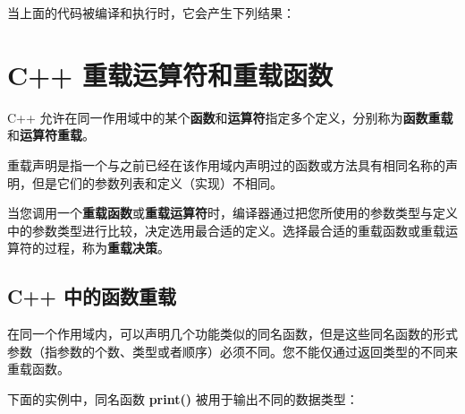\documentclass[
]{article}
\newenvironment{Shaded}{}{}
\newcommand{\CommentTok}[1]{\textcolor[rgb]{0.38,0.63,0.69}{\textit{#1}}}
\newcommand{\ControlFlowTok}[1]{\textcolor[rgb]{0.00,0.44,0.13}{\textbf{#1}}}
\newcommand{\DecValTok}[1]{\textcolor[rgb]{0.25,0.63,0.44}{#1}}
\newcommand{\ErrorTok}[1]{\textcolor[rgb]{1.00,0.00,0.00}{\textbf{#1}}}
\newcommand{\NormalTok}[1]{#1}
\newcommand{\OperatorTok}[1]{\textcolor[rgb]{0.40,0.40,0.40}{#1}}
\newcommand{\StringTok}[1]{\textcolor[rgb]{0.25,0.44,0.63}{#1}}
\begin{document}
\begin{Shaded}
\end{Shaded}

当上面的代码被编译和执行时，它会产生下列结果：

\begin{Shaded}
\end{Shaded}

\hypertarget{c-ux91cdux8f7dux8fd0ux7b97ux7b26ux548cux91cdux8f7dux51fdux6570}{%
\section{C++
重载运算符和重载函数}\label{c-ux91cdux8f7dux8fd0ux7b97ux7b26ux548cux91cdux8f7dux51fdux6570}}

C++
允许在同一作用域中的某个\textbf{函数}和\textbf{运算符}指定多个定义，分别称为\textbf{函数重载}和\textbf{运算符重载}。

重载声明是指一个与之前已经在该作用域内声明过的函数或方法具有相同名称的声明，但是它们的参数列表和定义（实现）不相同。

当您调用一个\textbf{重载函数}或\textbf{重载运算符}时，编译器通过把您所使用的参数类型与定义中的参数类型进行比较，决定选用最合适的定义。选择最合适的重载函数或重载运算符的过程，称为\textbf{重载决策}。

\hypertarget{c-ux4e2dux7684ux51fdux6570ux91cdux8f7d}{%
\subsection{C++
中的函数重载}\label{c-ux4e2dux7684ux51fdux6570ux91cdux8f7d}}

在同一个作用域内，可以声明几个功能类似的同名函数，但是这些同名函数的形式参数（指参数的个数、类型或者顺序）必须不同。您不能仅通过返回类型的不同来重载函数。

下面的实例中，同名函数 \textbf{print()} 被用于输出不同的数据类型：
\end{document}
